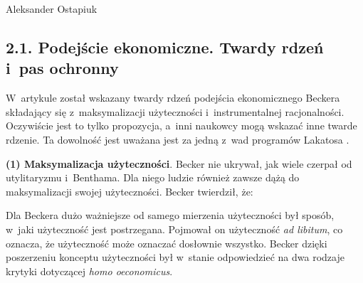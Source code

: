 \begin{artplenv}{Aleksander Ostapiuk}
\subsection{2.1. Podejście ekonomiczne. Twardy rdzeń i~pas ochronny}
W~artykule został wskazany twardy rdzeń podejścia ekonomicznego Beckera składający
się z~maksymalizacji użyteczności i~instrumentalnej racjonalności. Oczywiście jest to tylko propozycja, a~inni naukowcy mogą wskazać
inne twarde rdzenie. Ta
dowolność jest uważana jest za jedną z~wad programów Lakatosa
\parencite{marchi_appraising_1991}.

\textbf{(1) Maksymalizacja użyteczności}. Becker nie ukrywał, jak wiele czerpał od utylitaryzmu i~Benthama. Dla
niego ludzie również zawsze dążą do maksymalizacji swojej użyteczności. Becker twierdził, że:


Dla Beckera dużo ważniejsze od samego mierzenia użyteczności był sposób, w~jaki użyteczność jest postrzegana. Pojmował
on użyteczność \textit{ad libitum}, co oznacza, że użyteczność może oznaczać dosłownie wszystko. Becker dzięki
poszerzeniu konceptu użyteczności był w~stanie odpowiedzieć na dwa rodzaje krytyki dotyczącej \textit{homo oeconomicus}.


\end{artplenv}
